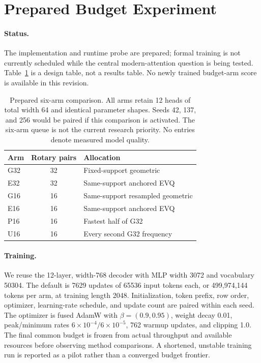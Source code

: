 \section{Prepared Budget Experiment}
\label{sec:budget-experiment}

\paragraph{Status.}
The implementation and runtime probe are prepared; formal training is not
currently scheduled while the central modern-attention question is being tested. Table~\ref{tab:budget-design}
is a design table, not a results table. No newly trained budget-arm score is
available in this revision.

\begin{table}[h]
\centering\small
\begin{tabular}{lcl}
\toprule Arm & Rotary pairs & Allocation \\
\midrule
G32 &32& Fixed-support geometric \\
E32 &32& Same-support anchored EVQ \\
G16 &16& Same-support resampled geometric \\
E16 &16& Same-support anchored EVQ \\
P16 &16& Fastest half of G32 \\
U16 &16& Every second G32 frequency \\
\bottomrule
\end{tabular}
\caption{Prepared six-arm comparison. All arms retain 12 heads of total
width 64 and identical parameter shapes. Seeds 42, 137, and 256 would be paired if this comparison is activated.
The six-arm queue is not the current research priority.
No entries denote measured model quality.}
\label{tab:budget-design}
\end{table}

\paragraph{Training.}
We reuse the 12-layer, width-768 decoder with MLP width 3072 and vocabulary
50304. The default is 7629 updates of 65536 input tokens each, or
499,974,144 tokens per arm, at training length 2048. Initialization, token
prefix, row order, optimizer, learning-rate schedule, and update count are
paired within each seed. The optimizer is fused AdamW with
$\beta=(0.9,0.95)$, weight decay 0.01, peak/minimum rates
$6\times10^{-4}/6\times10^{-5}$, 762 warmup updates, and clipping 1.0.
The final common budget is frozen from actual throughput and available resources
before observing method comparisons. A shortened, unstable training run is
reported as a pilot rather than a converged budget frontier.

